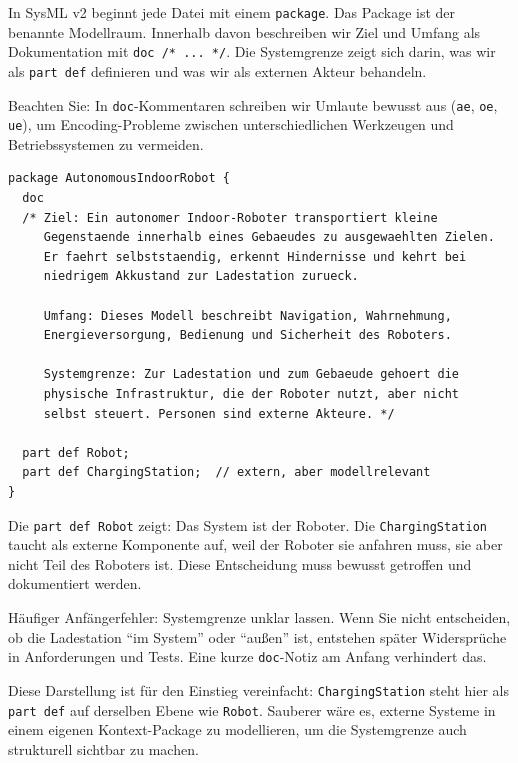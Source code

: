 In SysML v2 beginnt jede Datei mit einem \texttt{package}. Das Package ist der benannte Modellraum. Innerhalb davon beschreiben wir Ziel und Umfang als Dokumentation mit \texttt{doc~/*~...~*/}. Die Systemgrenze zeigt sich darin, was wir als \texttt{part def} definieren und was wir als externen Akteur behandeln.

Beachten Sie: In \texttt{doc}-Kommentaren schreiben wir Umlaute bewusst aus (\texttt{ae}, \texttt{oe}, \texttt{ue}), um Encoding-Probleme zwischen unterschiedlichen Werkzeugen und Betriebssystemen zu vermeiden.

\begin{lstlisting}
package AutonomousIndoorRobot {
  doc
  /* Ziel: Ein autonomer Indoor-Roboter transportiert kleine
     Gegenstaende innerhalb eines Gebaeudes zu ausgewaehlten Zielen.
     Er faehrt selbststaendig, erkennt Hindernisse und kehrt bei
     niedrigem Akkustand zur Ladestation zurueck.

     Umfang: Dieses Modell beschreibt Navigation, Wahrnehmung,
     Energieversorgung, Bedienung und Sicherheit des Roboters.

     Systemgrenze: Zur Ladestation und zum Gebaeude gehoert die
     physische Infrastruktur, die der Roboter nutzt, aber nicht
     selbst steuert. Personen sind externe Akteure. */

  part def Robot;
  part def ChargingStation;  // extern, aber modellrelevant
}
\end{lstlisting}

Die \texttt{part def Robot} zeigt: Das System ist der Roboter. Die \texttt{ChargingStation} taucht als externe Komponente auf, weil der Roboter sie anfahren muss, sie aber nicht Teil des Roboters ist. Diese Entscheidung muss bewusst getroffen und dokumentiert werden.

\begin{praxisbox}
Häufiger Anfängerfehler: Systemgrenze unklar lassen. Wenn Sie nicht entscheiden, ob die Ladestation \enquote{im System} oder \enquote{außen} ist, entstehen später Widersprüche in Anforderungen und Tests. Eine kurze \texttt{doc}-Notiz am Anfang verhindert das.
\end{praxisbox}

Diese Darstellung ist für den Einstieg vereinfacht: \texttt{ChargingStation} steht hier als \texttt{part def} auf derselben Ebene wie \texttt{Robot}. Sauberer wäre es, externe Systeme in einem eigenen Kontext-Package zu modellieren, um die Systemgrenze auch strukturell sichtbar zu machen.

